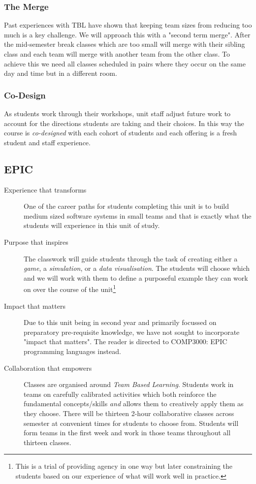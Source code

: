 \documentclass[twoside=false,DIV=14]{scrartcl}
\begin{document}
\subsubsection*{The Merge}

Past experiences with TBL have shown that keeping team sizes from reducing too much is a key challenge.  We will approach this with a "second term merge".  After the mid-semester break classes which are too small will merge with their sibling class and each team will merge with another team from the other class.  To achieve this we need all classes scheduled in pairs where they occur on the same day and time but in a different room.  

\subsubsection*{Co-Design}
As students work through their workshops, unit staff adjust future work to account for the directions students are taking and their choices.  In this way the course is \emph{co-designed} with each cohort of students and each offering is a fresh student and staff experience.

\subsection*{EPIC}

\begin{description}
\item[Experience that transforms] One of the career paths for students completing this unit is to build medium sized software systems in small teams and that is exactly what the students will experience in this unit of study.
\item[Purpose that inspires] The classwork will guide students through the task of creating either a \emph{game}, a \emph{simulation}, or a \emph{data visualisation}.  The students will choose which and we will work with them to define a purposeful example they can work on over the course of the unit\footnote{This is a trial of providing agency in one way but later constraining the students based on our experience of what will work well in practice.}
\item[Impact that matters] Due to this unit being in second year and primarily focussed on preparatory pre-requisite knowledge, we have not sought to incorporate "impact that matters".  The reader is directed to COMP3000: EPIC programming languages instead.
\item[Collaboration that empowers] Classes are organised around \emph{Team Based Learning}.  Students work in teams on carefully calibrated activities which both reinforce the fundamental concepts/skills \emph{and} allows them to creatively apply them as they choose.  There will be thirteen 2-hour collaborative classes across semester at convenient times for students to choose from.  Students will form teams in the first week and work in those teams throughout all thirteen classes.
\end{description}
\end{document}
